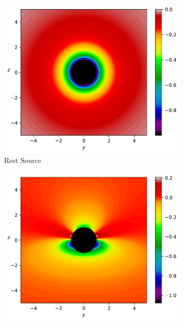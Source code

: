 \begin{figure}[H]
	\centering
	\begin{subfigure}{0.45\textwidth}
		\centering
		\includegraphics[width=\textwidth]{images/pdf/Directional_Derivative_of_Vector_Density_norm_of_Light_from_Rest_Source.pdf}
		\caption{Rest Source}
		\label{subfig_1: directional derivative of vector density norm}
	\end{subfigure}
	\begin{subfigure}{0.45\textwidth}
		\centering
		\includegraphics[width=\textwidth]{images/pdf/Directional_Derivative_of_Vector_Density_norm_of_Light_from_Moving_Source.pdf}

\end{subfigure}
\end{figure}
